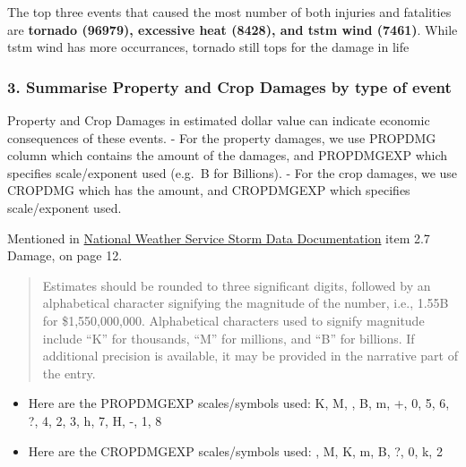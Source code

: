 \documentclass[]{article}
\begin{document}
The top three events that caused the most number of both injuries and
fatalities are \textbf{tornado (96979), excessive heat (8428), and tstm
wind (7461)}. While tstm wind has more occurrances, tornado still tops
for the damage in life

\subsubsection{3. Summarise Property and Crop Damages by type of
event}\label{summarise-property-and-crop-damages-by-type-of-event}

Property and Crop Damages in estimated dollar value can indicate
economic consequences of these events. - For the property damages, we
use PROPDMG column which contains the amount of the damages, and
PROPDMGEXP which specifies scale/exponent used (e.g.~B for Billions). -
For the crop damages, we use CROPDMG which has the amount, and
CROPDMGEXP which specifies scale/exponent used.

Mentioned in
\href{https://d396qusza40orc.cloudfront.net/repdata\%2Fpeer2_doc\%2Fpd01016005curr.pdf}{National
Weather Service Storm Data Documentation} item 2.7 Damage, on page 12.

\begin{quote}
Estimates should be rounded to three significant digits, followed by an
alphabetical character signifying the magnitude of the number, i.e.,
1.55B for \$1,550,000,000. Alphabetical characters used to signify
magnitude include ``K'' for thousands, ``M'' for millions, and ``B'' for
billions. If additional precision is available, it may be provided in
the narrative part of the entry.
\end{quote}

\begin{itemize}
\item
  Here are the PROPDMGEXP scales/symbols used: K, M, , B, m, +, 0, 5, 6,
  ?, 4, 2, 3, h, 7, H, -, 1, 8
\item
  Here are the CROPDMGEXP scales/symbols used: , M, K, m, B, ?, 0, k, 2
\end{itemize}
\end{document}
